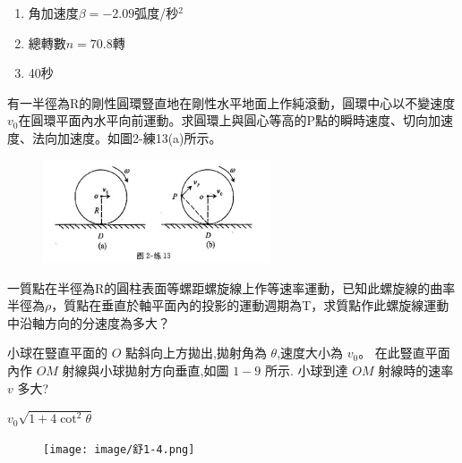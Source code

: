 \documentclass[cn,10pt,math=newtx,chinesefont=founder]{../elegantbook}
\begin{document}
\begin{solution}
\begin{enumerate}[label=(\arabic*)]
    \item 角加速度$\beta=-2.09$弧度/秒$^2$
    \item 總轉數$n=70.8$轉
    \item 40秒
\end{enumerate}

\end{solution}




\newpage

\begin{example}
    有一半徑為R的剛性圓環豎直地在剛性水平地面上作純滾動，圓環中心以不變速度$v_0$在圓環平面內水平向前運動。求圓環上與圓心等高的P點的瞬時速度、切向加速度、法向加速度。如圖2-練13(a)所示。
    
    \rightline{[練2-13]}
\end{example}

\begin{solution}

\end{solution}


\begin{figure}[htbp]
\flushright
\includegraphics[width=0.6\textwidth]{image/2-13.jpeg}
\end{figure}

\newpage

\begin{example}
    一質點在半徑為R的圓柱表面等螺距螺旋線上作等速率運動，已知此螺旋線的曲率半徑為$\rho$，質點在垂直於軸平面內的投影的運動週期為T，求質點作此螺旋線運動中沿軸方向的分速度為多大？
    \rightline{[練2-14]}
\end{example}

\begin{solution}

\end{solution}


\newpage

\begin{example}
    小球在豎直平面的 $O$ 點斜向上方拋出,拋射角為 $\theta$,速度大小為 $v_{0}$。
    在此豎直平面 內作 $O M$ 射線與小球拋射方向垂直,如圖 $1-9$ 所示. 小球到達 $O M$ 射線時的速率 
    $v$ 多大?\\
    \rightline{[舒1-4]}
\end{example}
\begin{solution}
    $v_{0} \sqrt{1+4 \cot ^{2} \theta}$
\end{solution}
\begin{figure}[htbp]
    \flushright
    \texttt{[image: image/舒1-4.png]}
\end{figure}
\newpage
\end{document}
